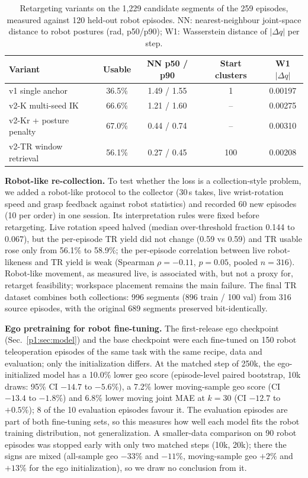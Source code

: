 \documentclass[conference,10pt]{IEEEtran}
\begin{document}
\begin{table}[t]
\centering\footnotesize\setlength{\tabcolsep}{3.5pt}
\caption{Retargeting variants on the 1{,}229 candidate segments of the 259 episodes, measured against 120 held-out robot
episodes. NN: nearest-neighbour joint-space distance to robot postures (rad, p50/p90); W1: Wasserstein distance of
$|\Delta q|$ per step.}
\label{p1:tab:retarget}
\begin{tabular}{@{}lcccc@{}}
\toprule
Variant & Usable & NN p50 / p90 & Start clusters & W1 $|\Delta q|$ \\
\midrule
v1 single anchor & 36.5\% & 1.49 / 1.55 & 1 & 0.00197 \\
v2-K multi-seed IK & 66.6\% & 1.21 / 1.60 & -- & 0.00275 \\
v2-Kr + posture penalty & 67.0\% & 0.44 / 0.74 & -- & 0.00310 \\
v2-TR window retrieval & 56.1\% & 0.27 / 0.45 & 100 & 0.00208 \\
\bottomrule
\end{tabular}
\end{table}

\textbf{Robot-like re-collection.} To test whether the loss is a collection-style problem, we added a robot-like protocol to
the collector (30\,s takes, live wrist-rotation speed and grasp feedback against robot statistics) and recorded 60 new
episodes (10 per order) in one session. Its interpretation rules were fixed before retargeting. Live rotation speed halved
(median over-threshold fraction 0.144 to 0.067), but the per-episode TR yield did not change (0.59 vs 0.59) and TR usable
rose only from 56.1\% to 58.9\%; the per-episode correlation between live robot-likeness and TR yield is weak
(Spearman $\rho=-0.11$, $p=0.05$, pooled $n=316$). Robot-like movement, as measured live, is associated with, but not a
proxy for, retarget feasibility; workspace placement remains the main failure. The final TR dataset combines both
collections: 996 segments (896 train / 100 val) from 316 source episodes, with the original 689 segments preserved
bit-identically.

\textbf{Ego pretraining for robot fine-tuning.} The first-release ego checkpoint (Sec.~\ref{p1:sec:model}) and the base
checkpoint were each fine-tuned on 150 robot teleoperation episodes of the same task with the same recipe, data and
evaluation; only the initialization differs. At the matched step of 250k, the ego-initialized model has a 10.0\% lower geo
score (episode-level paired bootstrap, 10k draws: 95\% CI $-14.7$ to $-5.6\%$), a 7.2\% lower moving-sample geo score (CI
$-13.4$ to $-1.8\%$) and 6.8\% lower moving joint MAE at $k{=}30$ (CI $-12.7$ to $+0.5\%$); 8 of the 10 evaluation
episodes favour it. The evaluation episodes are part of both fine-tuning sets, so this measures how well each model fits
the robot training distribution, not generalization. A smaller-data comparison on 90 robot episodes was stopped early with
only two matched steps (10k, 20k); there the signs are mixed (all-sample geo $-33\%$ and $-11\%$, moving-sample geo $+2\%$ and
$+13\%$ for the ego initialization), so we draw no conclusion from it.
\end{document}
